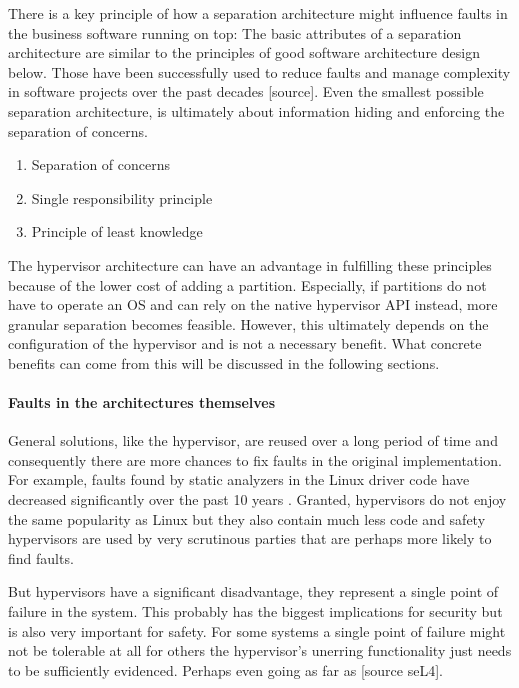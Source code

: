 There is a key principle of how a separation architecture might influence faults in the business software running on top: The basic attributes of a separation architecture are similar to the principles of good software architecture design below. Those have been successfully used to reduce faults and manage complexity in software projects over the past decades [source]. Even the smallest possible separation architecture, is ultimately about information hiding and enforcing the separation of concerns.
\begin{enumerate}
\item Separation of concerns
\item Single responsibility principle
\item Principle of least knowledge
\end{enumerate}
The hypervisor architecture can have an advantage in fulfilling these principles because of the lower cost of adding a partition. Especially, if partitions do not have to operate an OS and can rely on the native hypervisor \gls{API} instead, more granular separation becomes feasible. However, this ultimately depends on the configuration of the hypervisor and is not a necessary benefit.
What concrete benefits can come from this will be discussed in the following sections.
\paragraph{Faults in the architectures themselves}
General solutions, like the hypervisor, are reused over a long period of time and consequently there are more chances to fix faults in the original implementation. For example, faults found by static analyzers in the Linux driver code have decreased significantly over the past 10 years \cite{palix2011faults}. Granted, hypervisors do not enjoy the same popularity as Linux but they also contain much less code and safety hypervisors are used by very scrutinous  parties that are perhaps more likely to find faults.

But hypervisors have a significant disadvantage, they represent a single point of failure in the system. This probably has the biggest implications for security but is also very important for safety. For some systems a single point of failure might not be tolerable at all for others the hypervisor's unerring functionality just needs to be sufficiently evidenced. Perhaps even going as far as  [source seL4].

